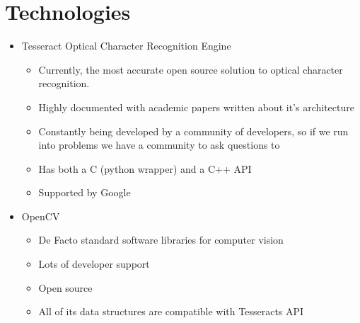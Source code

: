 	\section{Technologies}
		\begin{itemize}
			\item Tesseract Optical Character Recognition Engine
			\begin{itemize}
				\item Currently, the most accurate open source solution to optical character recognition.
				\item Highly documented with academic papers written about it’s architecture
				\item Constantly being developed by a community of developers, so if we run into problems we have a community to ask questions to
				\item Has both a C (python wrapper) and a C++ API
				\item Supported by Google
			\end{itemize}

			\item OpenCV
			\begin{itemize}
				\item De Facto standard software libraries for computer vision
				\item Lots of developer support
				\item Open source
				\item All of its data structures are compatible with Tesseracts API
			\end{itemize}

%
		\end{itemize}